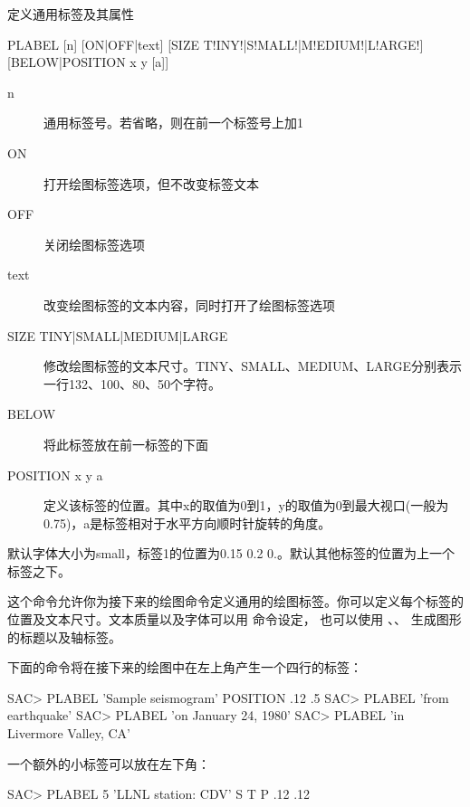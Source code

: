 \label{cmd:plabel}

定义通用标签及其属性

\begin{SACSTX}
PLABEL [n] [ON|OFF|text] [SIZE T!INY!|S!MALL!|M!EDIUM!|L!ARGE!]
    [BELOW|POSITION x y [a]]
\end{SACSTX}

\begin{description}
\item [n] 通用标签号。若省略，则在前一个标签号上加1
\item [ON] 打开绘图标签选项，但不改变标签文本
\item [OFF] 关闭绘图标签选项
\item [text] 改变绘图标签的文本内容，同时打开了绘图标签选项
\item [SIZE TINY|SMALL|MEDIUM|LARGE] 修改绘图标签的文本尺寸。TINY、SMALL、MEDIUM、LARGE分别表示
    一行132、100、80、50个字符。
\item [BELOW] 将此标签放在前一标签的下面
\item [POSITION x y a] 定义该标签的位置。其中x的取值为0到1，y的取值为0到最大视口(一般为0.75)，a是标签相对于水平方向顺时针旋转的角度。
\end{description}

默认字体大小为small，标签1的位置为0.15 0.2 0.。默认其他标签的位置为上一个标签之下。

这个命令允许你为接下来的绘图命令定义通用的绘图标签。你可以定义每个标签的
位置及文本尺寸。文本质量以及字体可以用  命令设定，
也可以使用 、、
生成图形的标题以及轴标签。

下面的命令将在接下来的绘图中在左上角产生一个四行的标签：
\begin{SACCode}
SAC> PLABEL 'Sample seismogram' POSITION .12 .5
SAC> PLABEL 'from earthquake'
SAC> PLABEL 'on January 24, 1980'
SAC> PLABEL 'in Livermore Valley, CA'
\end{SACCode}

一个额外的小标签可以放在左下角：
\begin{SACCode}
SAC> PLABEL 5 'LLNL station: CDV' S T P .12 .12
\end{SACCode}
